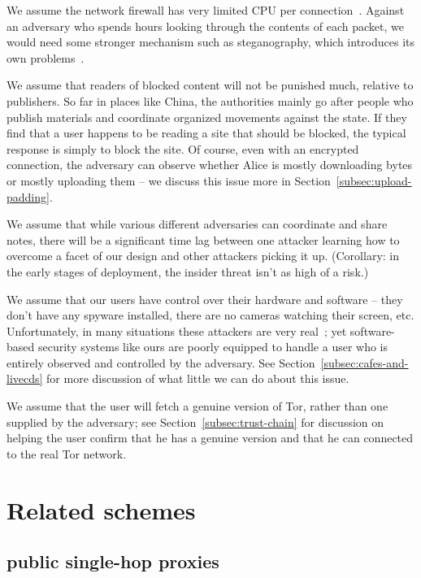 \documentclass{llncs}
\begin{document}
We assume the network firewall has very limited CPU per
connection~\cite{clayton:pet2006}. Against an adversary who spends
hours looking through the contents of each packet, we would need
some stronger mechanism such as steganography, which introduces its
own problems~\cite{active-wardens,foo,bar}.

We assume that readers of blocked content will not be punished much,
relative to publishers. So far in places like China, the authorities
mainly go after people who publish materials and coordinate organized
movements against the state. If they find that a user happens to be
reading a site that should be blocked, the typical response is simply
to block the site. Of course, even with an encrypted connection,
the adversary can observe whether Alice is mostly downloading
bytes or mostly uploading them -- we discuss this issue more in
Section~\ref{subsec:upload-padding}.

We assume that while various different adversaries can coordinate and share
notes, there will be a significant time lag between one attacker learning
how to overcome a facet of our design and other attackers picking it up.
(Corollary: in the early stages of deployment, the insider threat isn't
as high of a risk.)

We assume that our users have control over their hardware and
software -- they don't have any spyware installed, there are no
cameras watching their screen, etc. Unfortunately, in many situations
these attackers are very real~\cite{zuckerman-threatmodels}; yet
software-based security systems like ours are poorly equipped to handle
a user who is entirely observed and controlled by the adversary. See
Section~\ref{subsec:cafes-and-livecds} for more discussion of what little
we can do about this issue.

We assume that the user will fetch a genuine version of Tor, rather than
one supplied by the adversary; see Section~\ref{subsec:trust-chain}
for discussion on helping the user confirm that he has a genuine version
and that he can connected to the real Tor network.

\section{Related schemes}

\subsection{public single-hop proxies}
\end{document}
